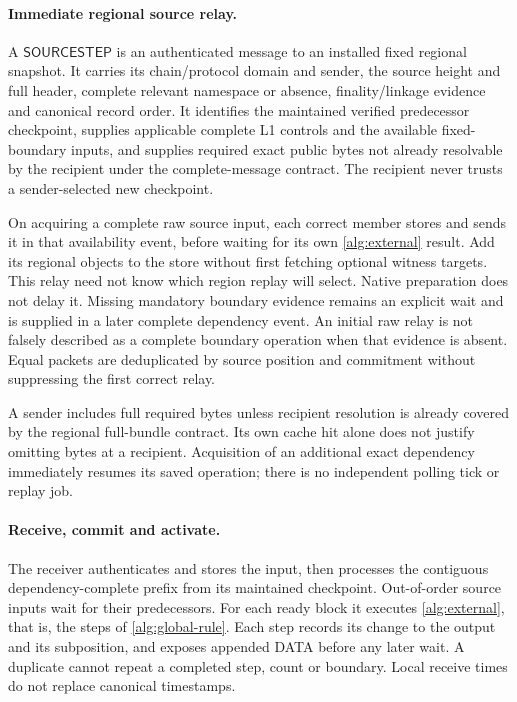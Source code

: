 \documentclass[11pt,a4paper]{article}
\newcommand{\tagg}[1]{\ensuremath{\mathsf{#1}}}
\newcounter{protocol}
\begin{document}
\paragraph{Immediate regional source relay.}
A \tagg{SOURCESTEP} is an authenticated message to an installed fixed
regional snapshot. It carries its chain/protocol domain and sender,
the source height and full header, complete relevant namespace or
absence, finality/linkage evidence and canonical record order. It
identifies the maintained verified predecessor checkpoint, supplies
applicable complete L1 controls and the available fixed-boundary
inputs, and supplies required exact public bytes not already resolvable
by the recipient under the complete-message contract. The
recipient never trusts a sender-selected new checkpoint.

On acquiring a complete raw source input, each correct member stores
and sends it in that availability event, before waiting for its own
\cref{alg:external} result. Add its regional objects to the store
without first fetching optional witness targets. This relay
need not know which region replay will select. Native preparation does
not delay it. Missing mandatory boundary evidence remains an explicit
wait and is supplied in a later complete dependency event. An initial
raw relay is not falsely described as a complete boundary operation
when that evidence is absent. Equal packets are deduplicated by source
position and commitment without suppressing the first correct relay.

A sender includes full required bytes unless recipient resolution is
already covered by the regional full-bundle contract. Its own cache hit
alone does not justify omitting bytes at a recipient. Acquisition of an
additional exact dependency immediately resumes its saved operation;
there is no independent polling tick or replay job.

\paragraph{Receive, commit and activate.}
The receiver authenticates and stores the input, then processes the
contiguous dependency-complete prefix from its maintained checkpoint.
Out-of-order source inputs wait for their predecessors. For each ready
block it executes \cref{alg:external}, that is, the steps of
\cref{alg:global-rule}. Each step records its change to the output and
its subposition, and exposes appended DATA before any later wait. A
duplicate cannot repeat a completed step, count or boundary. Local
receive times do not replace canonical timestamps.
\end{document}
